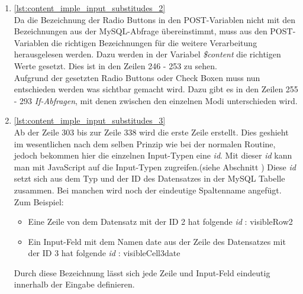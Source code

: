 \begin{enumerate}
	\item \autoref{lst:content_imple_input_substitudes_2}\\
	Da die Bezeichnung der Radio Buttons in den POST-Variablen nicht mit den Bezeichnungen aus der MySQL-Abfrage übereinstimmt, muss aus den POST-Variablen die richtigen Bezeichnungen für die weitere Verarbeitung herausgelesen werden. Dazu werden in der Variabel \textit{\$content} die richtigen Werte gesetzt. Dies ist in den Zeilen 246 - 253 zu sehen.\\
	Aufgrund der gesetzten Radio Buttons oder Check Boxen muss nun entschieden werden was sichtbar gemacht wird. Dazu gibt es in den Zeilen 255 - 293 \textit{If-Abfragen}, mit denen zwischen den einzelnen Modi unterschieden wird.\\ 
	
	
	\item \autoref{lst:content_imple_input_substitudes_3}\\
	Ab der Zeile 303 bis zur Zeile 338 wird die erste Zeile erstellt. Dies geshieht im wesentlichen nach dem selben Prinzip wie bei der normalen Routine, jedoch bekommen hier die einzelnen Input-Typen eine \textit{id}. Mit dieser \textit{id} kann man mit JavaScript auf die Input-Typen zugreifen.(siehe Abschnitt ) Diese \textit{id} setzt sich aus dem Typ und der ID des Datensatzes in der MySQL Tabelle zusammen. Bei manchen wird noch der eindeutige Spaltenname angefügt.\\
	Zum Beispiel:
	\begin{itemize}
		\item Eine Zeile von dem Datensatz mit der ID 2 hat folgende \textit{id} : visibleRow2
		\item Ein Input-Feld mit dem Namen date aus der Zeile des Datensatzes mit der ID 3 hat folgende \textit{id} : visibleCell3date
	\end{itemize}
	Durch diese Bezeichnung lässt sich jede Zeile und Input-Feld eindeutig innerhalb der Eingabe definieren.\\
	
	
	

\end{enumerate}
